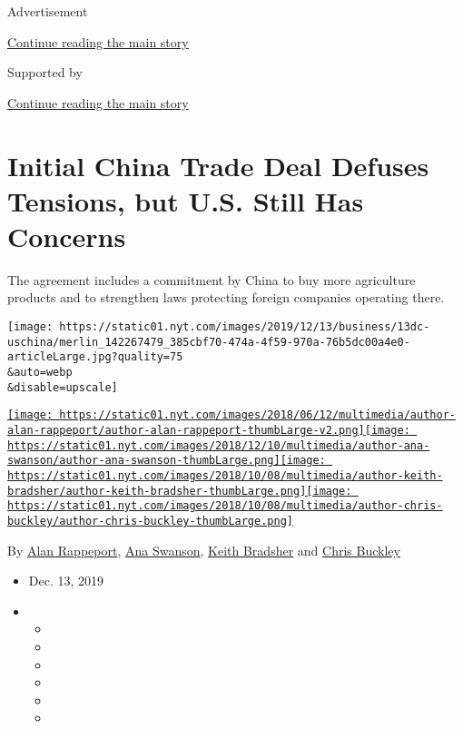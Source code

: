 Advertisement

\protect\hyperlink{after-top}{Continue reading the main story}

Supported by

\protect\hyperlink{after-sponsor}{Continue reading the main story}

\hypertarget{initial-china-trade-deal-defuses-tensions-but-us-still-has-concerns}{%
\section{Initial China Trade Deal Defuses Tensions, but U.S. Still Has
Concerns}\label{initial-china-trade-deal-defuses-tensions-but-us-still-has-concerns}}

The agreement includes a commitment by China to buy more agriculture
products and to strengthen laws protecting foreign companies operating
there.

\texttt{[image: https://static01.nyt.com/images/2019/12/13/business/13dc-uschina/merlin\_142267479\_385cbf70-474a-4f59-970a-76b5dc00a4e0-articleLarge.jpg?quality=75\\\&auto=webp\\\&disable=upscale]}

\href{https://www.nytimes.com/by/alan-rappeport}{\texttt{[image: https://static01.nyt.com/images/2018/06/12/multimedia/author-alan-rappeport/author-alan-rappeport-thumbLarge-v2.png]}}\href{https://www.nytimes.com/by/ana-swanson}{\texttt{[image: https://static01.nyt.com/images/2018/12/10/multimedia/author-ana-swanson/author-ana-swanson-thumbLarge.png]}}\href{https://www.nytimes.com/by/keith-bradsher}{\texttt{[image: https://static01.nyt.com/images/2018/10/08/multimedia/author-keith-bradsher/author-keith-bradsher-thumbLarge.png]}}\href{https://www.nytimes.com/by/chris-buckley}{\texttt{[image: https://static01.nyt.com/images/2018/10/08/multimedia/author-chris-buckley/author-chris-buckley-thumbLarge.png]}}

By \href{https://www.nytimes.com/by/alan-rappeport}{Alan Rappeport},
\href{https://www.nytimes.com/by/ana-swanson}{Ana Swanson},
\href{https://www.nytimes.com/by/keith-bradsher}{Keith Bradsher} and
\href{https://www.nytimes.com/by/chris-buckley}{Chris Buckley}

\begin{itemize}
\item
  Dec. 13, 2019
\item
  \begin{itemize}
  \item
  \item
  \item
  \item
  \item
  \item
  \end{itemize}
\end{itemize}

